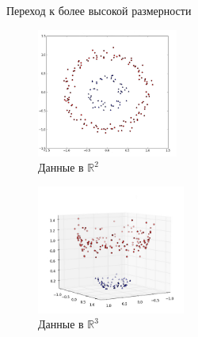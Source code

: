 \documentclass[12pt]{beamer}
\begin{document}
\begin{frame}{Переход к более высокой размерности}
	\begin{figure}[htbp]
		\begin{minipage}{.5\textwidth}
		  \includegraphics[height=120pt, keepaspectratio = true]{images/data-r2} \\
			\centering Данные в $\mathbb{R}^2$
	  \end{minipage}%
	  \begin{minipage}{.5\textwidth}
			\includegraphics[height=120pt, keepaspectratio = true]{images/data-r3}   \\
			\centering Данные в $\mathbb{R}^3$
		\end{minipage}%
	
	\end{figure}
\end{frame}
\end{document}
